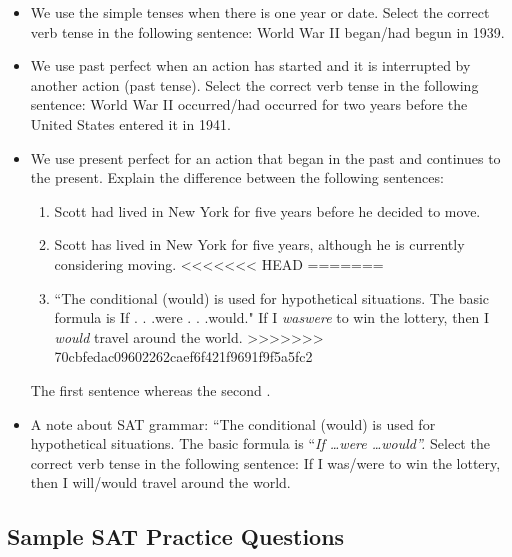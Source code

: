 \begin{itemize}
\item{We use the simple tenses when there is one year or date. Select the correct verb tense in the following sentence: World War II
began/had begun in 1939.}
\item{We use past perfect when an action has started and it is interrupted by another action (past
tense). Select the correct verb tense in the following sentence: World War II occurred/had occurred for two years before the United
States entered it in 1941.}
\item{We use present perfect for an action that began in the past and continues to the present.
Explain the difference between the following sentences:}

\begin{enumerate}
\item{Scott had lived in New York for five years before he decided to move.}
\item{Scott has lived in New York for five years, although he is currently considering moving.}
<<<<<<< HEAD
=======
\item{``The conditional (would) is used for hypothetical situations. The basic formula is \/If . . .were
. . .would." If I \textit{was\/were} to win the lottery, then I \textit{would} travel around the world.}
>>>>>>> 70cbfedac09602262caef6f421f9691f9f5a5fc2
\end{enumerate}

The first sentence \hrulefill whereas the second \hrulefill.

\item A note about SAT grammar: ``The conditional (would) is used for hypothetical situations. The basic formula is ``\textit{If \ldots were \ldots would''.} Select the correct verb tense in the following sentence: If I was/were to win the lottery, then I will/would travel around the world.

\end{itemize}

\subsection{Sample SAT Practice Questions}

